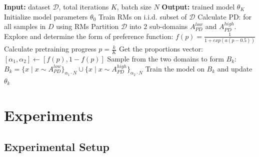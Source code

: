 \documentclass[11pt]{article}
\begin{document}
\begin{algorithm}[t]
\caption{\small PD-based Preference Curriculum Learning}
\small
\begin{algorithmic}[1]
\State \textbf{Input:} dataset $\mathcal{D}$, total iterations $K$, batch size $N$
\State \textbf{Output:} trained model $\theta_K$
\State Initialize model parameters $\theta_0$
\State Train RMs on i.i.d. subset of $\mathcal{D}$ 
\State Calculate PD: for all samples in $D$ using RMs
\State Partition \( \mathcal{D} \) into \( 2 \) sub-domains \( A_{PD}^{low} \) and $A_{PD}^{high}$.  
\State Explore and determine the form of preference function:
\State \quad \quad $f(p) = \frac{1}{1 + exp{(a(p - 0.5))}}$
    \State Calculate pretraining progress  $p = \frac{k}{K}$
    \State Get the proportions vector: 
    \State  \quad  $[\alpha_{1}, \alpha_{2}] \gets [f(p), 1-f(p)]$
    \State Sample from the two domains to form $B_{k}$:
    \State $B_{k} = \{x \mid x \sim A_{PD}^{low}\}_{\alpha_{1} \cdot N} \cup \{x \mid x \sim A_{PD}^{high}\}_{\alpha_{2} \cdot N}$
    \State Train the model on \( B_k \) and update \(\theta_k\)
\EndFor

\end{algorithmic}
\end{algorithm}

\section{Experiments}

\subsection{Experimental Setup}
\end{document}
